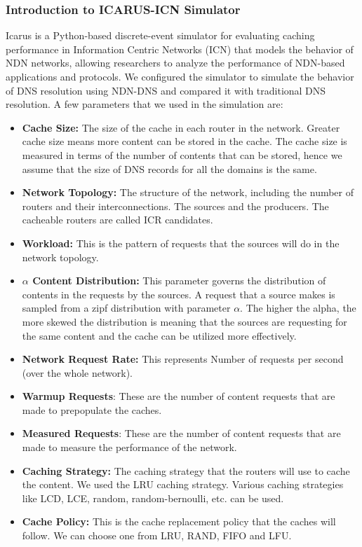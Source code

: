\documentclass[conference]{IEEEtran}
\begin{document}
\subsubsection{Introduction to ICARUS-ICN Simulator \cite{icarus-simutools14}} Icarus is a Python-based discrete-event simulator for evaluating caching performance in Information Centric Networks (ICN) that models the behavior of NDN networks, allowing researchers to analyze the performance of NDN-based applications and protocols. We configured the simulator to simulate the behavior of DNS resolution using NDN-DNS and compared it with traditional DNS resolution. A few parameters that we used in the simulation are:
\begin{itemize}
    \item \textbf{Cache Size:} The size of the cache in each router in the network. Greater cache size means more content can be stored in the cache. The cache size is measured in terms of the number of contents that can be stored, hence we assume that the size of DNS records for all the domains is the same.
    \item \textbf{Network Topology:} The structure of the network, including the number of routers and their interconnections. The sources and the producers. The cacheable routers are called ICR candidates.
    \item \textbf{Workload:} This is the pattern of requests that the sources will do in the network topology.
    \item \textbf{$\alpha$ Content Distribution:} This parameter governs the distribution of contents in the requests by the sources. A request that a source makes is sampled from a zipf distribution with parameter $\alpha$. The higher the alpha, the more skewed the distribution is meaning that the sources are requesting for the same content and the cache can be utilized more effectively. 
    \item \textbf{Network Request Rate:} This represents Number of requests per second (over the whole network).
    \item \textbf{Warmup Requests}: These are the number of content requests that are made to prepopulate the caches.
    \item \textbf{Measured Requests}: These are the number of content requests that are made to measure the performance of the network.
    \item \textbf{Caching Strategy:} The caching strategy that the routers will use to cache the content. We used the LRU caching strategy. Various caching strategies like LCD, LCE, random, random-bernoulli, etc. can be used.
    \item \textbf{Cache Policy:} This is the cache replacement policy that the caches will follow. We can choose one from LRU, RAND, FIFO and LFU.
\end{itemize}
\end{document}
